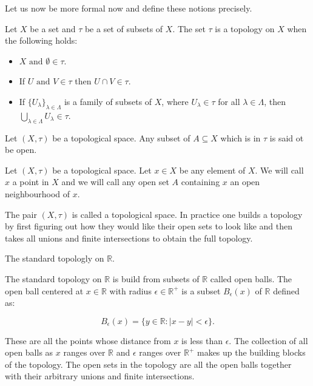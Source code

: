 Let us now be more formal now and define these notions precisely.

\begin{defn} Let $X$ be a set and $\tau$ be a set of subsets of $X$. The set $\tau$ is a topology on $X$ when the following holds:  \end{defn}

\begin{itemize}
    \item $X \text{ and } \emptyset \in \tau$.
    \item If $U \text{ and } V \in \tau$ then $U \cap V \in \tau$.
    \item If $\{U_\lambda\}_{\lambda \in \Lambda}$ is a family of subsets of $X$, where $U_\lambda \in \tau$ for all $\lambda \in \Lambda$, then 
        $\bigcup_{\lambda \in \Lambda}{U_\lambda} \in \tau$.
\end{itemize}

\begin{defn} Let $(X, \tau)$ be a topological space. Any subset of $A \subseteq X$ which is in $\tau$ is said ot be open.  \end{defn}

\begin{defn} Let $(X, \tau)$ be a topological space. Let $x \in X$ be any element of $X$. We will call $x$ a point in $X$ and we will call any open set $A$ containing $x$ an open neighbourhood of $x$.  \end{defn}

The pair $(X, \tau)$ is called a topological space. In practice one builds a topology by first figuring out how they would like their open sets to look like and then takes all unions and finite intersections to obtain the full topology.

\begin{ex} The standard topologly on $\mathbb{R}$.  \end{ex}

The standard topology on $\mathbb{R}$ is build from subsets of $\mathbb{R}$ called open balls. The open ball centered at $x \in \mathbb{R}$ with radius $\epsilon \in \mathbb{R}^+$ is a subset $B_\epsilon(x)$ of $\mathbb{R}$ defined as:

$$ B_\epsilon(x) = \{y \in \mathbb{R} : |x - y| < \epsilon \} .$$

These are all the points whose distance from $x$ is less than $\epsilon$. The collection of all open balls as $x$ ranges over $\mathbb{R}$ and $\epsilon$ ranges over $\mathbb{R}^+$ makes up the building blocks of the topology. The open sets in the topology are all the open balls together with their arbitrary unions and finite intersections.


